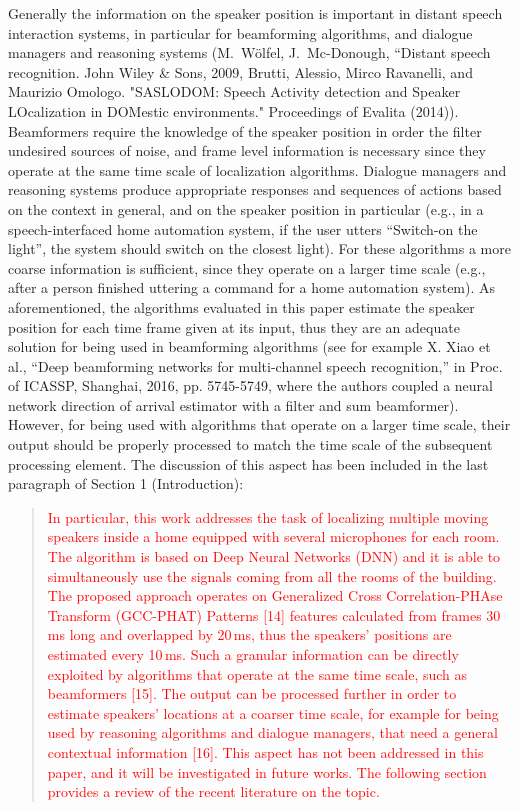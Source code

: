 \documentclass[11pt, technote, letterpaper, oneside, onecolumn]{IEEEtran}
\begin{document}
\begin{enumerate}
Generally the information on the speaker position is important in distant speech interaction systems, in particular for beamforming algorithms, and dialogue managers and reasoning systems (M.\ W\"olfel, J.\ Mc-Donough, ``Distant speech recognition. John Wiley \& Sons, 2009, Brutti, Alessio, Mirco Ravanelli, and Maurizio Omologo. "SASLODOM: Speech Activity detection and Speaker LOcalization in DOMestic environments." Proceedings of Evalita (2014)). Beamformers require the knowledge of the speaker position in order the filter undesired sources of noise, and frame level information is necessary since they operate at the same time scale of localization algorithms. Dialogue managers and reasoning systems produce appropriate responses and sequences of actions based on the context in general, and on the speaker position in particular (e.g., in a speech-interfaced home automation system, if the user utters ``Switch-on the light'', the system should switch on the closest light).  For these algorithms a more coarse information is sufficient, since they operate on a larger time scale (e.g., after a person finished uttering a command for a home automation system). As aforementioned, the algorithms evaluated in this paper estimate the speaker position for each time frame given at its input, thus they are an adequate solution for being used in beamforming algorithms (see for example X. Xiao et al., ``Deep beamforming networks for multi-channel speech recognition,'' in Proc. of ICASSP, Shanghai, 2016, pp. 5745-5749, where the authors coupled a neural network direction of arrival estimator with a filter and sum beamformer). However, for being used with algorithms that operate on a larger time scale, their output should be properly processed to match the time scale of the subsequent processing element. 
The discussion of this aspect has been included in the last paragraph of Section 1 (Introduction):
\begin{quote}
\textcolor{red} {
In particular, this work addresses the task of localizing multiple moving speakers inside a home equipped with several microphones for each room. The algorithm is based on Deep Neural Networks (DNN) and it is able to simultaneously use the signals coming from all the rooms of the building. The proposed approach operates on Generalized Cross Correlation-PHAse Transform (GCC-PHAT) Patterns [14] features calculated from frames 30\,ms long and overlapped by 20\,ms, thus the speakers' positions are estimated every 10\,ms. Such a granular information can be directly exploited by algorithms that operate at the same time scale, such as beamformers [15]. The output can be processed further in order to estimate speakers' locations at a coarser time scale, for example for being used by reasoning algorithms and dialogue managers, that need a general contextual information [16]. This aspect has not been addressed in this paper, and it will be investigated in future works. The following section provides a review of the recent literature on the topic.
}
\end{quote}


\end{enumerate}
\end{document}
